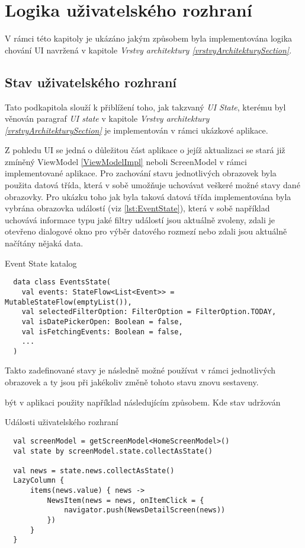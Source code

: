 \section{Logika uživatelského rozhraní} \label{UILayerImpl}
V rámci této kapitoly je ukázáno jakým způsobem byla implementována logika chování UI navržená v kapitole 
\textit{Vrstvy architektury \ref{vrstvyArchitekturySection}}.



\subsection{Stav uživatelského rozhraní} \label{stateHandlingImpl}
Tato podkapitola slouží k přiblížení toho, jak takzvaný \textit{UI State}, kterému byl věnován paragraf \textit{UI state} v 
kapitole \textit{Vrstvy architektury \ref{vrstvyArchitekturySection} } je implementován v rámci ukázkové aplikace.

Z pohledu UI se jedná o důležitou část aplikace o jejíž aktualizaci se stará již zmíněný ViewModel \ref{ViewModelImpl} neboli ScreenModel v rámci
implementované aplikace. 
Pro zachování stavu jednotlivých obrazovek byla použita datová třída, která v sobě umožňuje uchovávat veškeré možné stavy dané obrazovky.
Pro ukázku toho jak byla taková datová třída implementována byla vybrána obrazovka událostí (viz \ref{lst:EventState}), která v sobě 
například uchovává informace typu jaké filtry událostí jsou aktuálně zvoleny, zdali je otevřeno dialogové okno pro výběr datového rozmezí 
nebo zdali jsou aktuálně načítány nějaká data.
\begin{listing}[H]
\caption{Event State katalog}\label{lst:EventState}
\begin{verbatim}
  data class EventsState(
    val events: StateFlow<List<Event>> = MutableStateFlow(emptyList()),
    val selectedFilterOption: FilterOption = FilterOption.TODAY,
    val isDatePickerOpen: Boolean = false,
    val isFetchingEvents: Boolean = false,
    ...
  )
\end{verbatim}
\end{listing}

Takto zadefinované stavy je následně možné používat v rámci jednotlivých obrazovek a ty jsou při jakékoliv změně tohoto stavu znovu sestaveny.

být v aplikaci použity například následujícím způsobem. Kde stav udržován 
\begin{listing}[H]
\caption{Události uživatelského rozhraní}\label{lst:StateImpl}
\begin{verbatim}
  val screenModel = getScreenModel<HomeScreenModel>()
  val state by screenModel.state.collectAsState()

  val news = state.news.collectAsState()
  LazyColumn {
      items(news.value) { news ->
          NewsItem(news = news, onItemClick = {
              navigator.push(NewsDetailScreen(news))
          })
      }
  }
\end{verbatim}
\end{listing}

